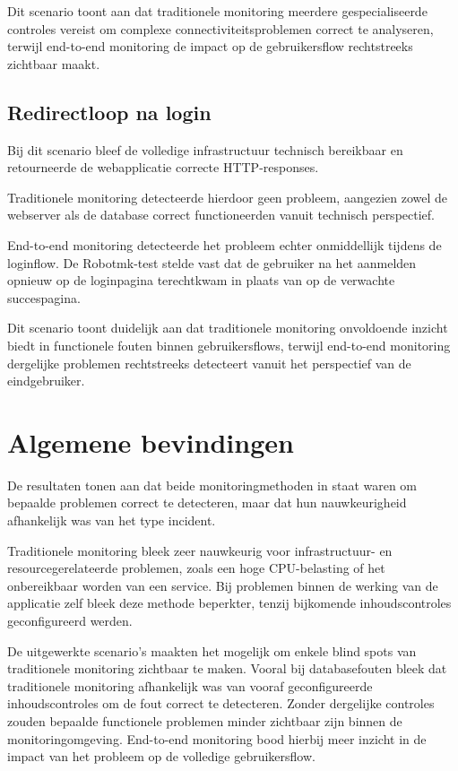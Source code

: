 Dit scenario toont aan dat traditionele monitoring meerdere gespecialiseerde controles vereist om complexe connectiviteitsproblemen correct te analyseren, terwijl end-to-end monitoring de impact op de gebruikersflow rechtstreeks zichtbaar maakt.

\subsection{Redirectloop na login}

Bij dit scenario bleef de volledige infrastructuur technisch bereikbaar en retourneerde de webapplicatie correcte HTTP-responses.

Traditionele monitoring detecteerde hierdoor geen probleem, aangezien zowel de webserver als de database correct functioneerden vanuit technisch perspectief.

End-to-end monitoring detecteerde het probleem echter onmiddellijk tijdens de loginflow. De Robotmk-test stelde vast dat de gebruiker na het aanmelden opnieuw op de loginpagina terechtkwam in plaats van op de verwachte succespagina.

Dit scenario toont duidelijk aan dat traditionele monitoring onvoldoende inzicht biedt in functionele fouten binnen gebruikersflows, terwijl end-to-end monitoring dergelijke problemen rechtstreeks detecteert vanuit het perspectief van de eindgebruiker.

\section{Algemene bevindingen}

De resultaten tonen aan dat beide monitoringmethoden in staat waren om bepaalde problemen correct te detecteren, maar dat hun nauwkeurigheid afhankelijk was van het type incident.

Traditionele monitoring bleek zeer nauwkeurig voor infrastructuur- en resourcegerelateerde problemen, zoals een hoge CPU-belasting of het onbereikbaar worden van een service. Bij problemen binnen de werking van de applicatie zelf bleek deze methode beperkter, tenzij bijkomende inhoudscontroles geconfigureerd werden.

De uitgewerkte scenario’s maakten het mogelijk om enkele blind spots van traditionele monitoring zichtbaar te maken. Vooral bij databasefouten bleek dat traditionele monitoring afhankelijk was van vooraf geconfigureerde inhoudscontroles om de fout correct te detecteren. Zonder dergelijke controles zouden bepaalde functionele problemen minder zichtbaar zijn binnen de monitoringomgeving. End-to-end monitoring bood hierbij meer inzicht in de impact van het probleem op de volledige gebruikersflow.


